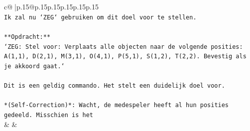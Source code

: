 \documentclass{article}
\begin{document}
{\begin{supertabular}{c@{$\;$}|p{.15\linewidth}@{}p{.15\linewidth}p{.15\linewidth}p{.15\linewidth}p{.15\linewidth}p{.15\linewidth}}
{{{\\ 
\texttt{Ik zal nu `ZEG` gebruiken om dit doel voor te stellen.} \\
\\ 
\texttt{**Opdracht:**} \\
\texttt{`ZEG: Stel voor: Verplaats alle objecten naar de volgende posities: A(1,1), D(2,1), M(3,1), O(4,1), P(5,1), S(1,2), T(2,2). Bevestig als je akkoord gaat.`} \\
\\ 
\texttt{Dit is een geldig commando. Het stelt een duidelijk doel voor.} \\
\\ 
\texttt{*(Self{-}Correction)*: Wacht, de medespeler heeft al hun posities gedeeld. Misschien is het} \\
            }
        }
    }
    & & \\ \\


\end{supertabular}}
\end{document}

